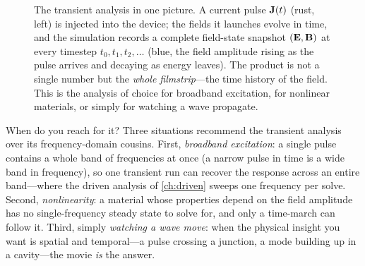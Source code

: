 \begin{figure}[t]
\centering
{}
\caption[The transient setup---a pulse and a filmstrip]{The transient analysis
in one picture. A current pulse $\mathbf{J}(t)$ (rust, left) is injected into the device;
the fields it launches evolve in time, and the simulation records a complete
field-state snapshot $(\mathbf{E},\mathbf{B})$ at every timestep $t_0,t_1,t_2,\dots$ (blue, the
field amplitude rising as the pulse arrives and decaying as energy leaves). The
product is not a single number but the \emph{whole filmstrip}---the time history
of the field. This is the analysis of choice for broadband excitation, for
nonlinear materials, or simply for watching a wave propagate.}
\label{fig:tr-setup}
\end{figure}

When do you reach for it? Three situations recommend the transient analysis over
its frequency-domain cousins. First, \emph{broadband excitation}: a single pulse
contains a whole band of frequencies at once (a narrow pulse in time is a wide
band in frequency), so one transient run can recover the response across an entire
band---where the driven analysis of \cref{ch:driven} sweeps one frequency per
solve. Second, \emph{nonlinearity}: a material whose properties depend on the
field amplitude has no single-frequency steady state to solve for, and only a
time-march can follow it. Third, simply \emph{watching a wave move}: when the
physical insight you want is spatial and temporal---a pulse crossing a junction, a
mode building up in a cavity---the movie \emph{is} the answer.

